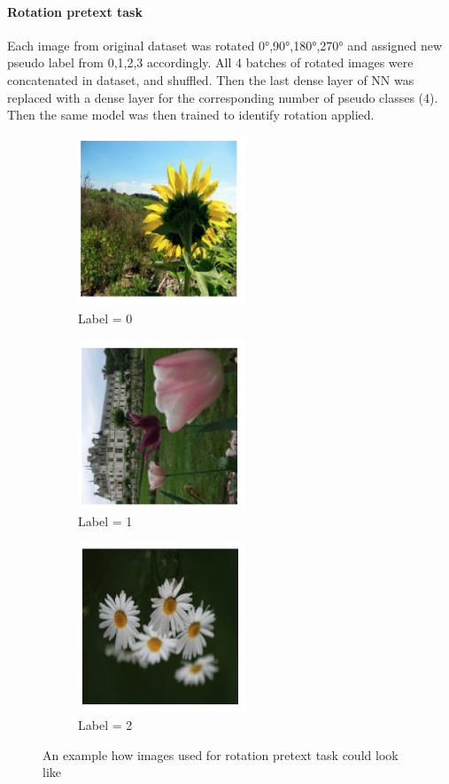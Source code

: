 \paragraph{Rotation pretext task}
Each image from original dataset was rotated 0°,90°,180°,270° and assigned new pseudo label from 0,1,2,3 accordingly.
All 4 batches of rotated images were concatenated in dataset, and shuffled.
Then the last dense layer of NN was replaced with a dense layer for the corresponding number of pseudo classes (4).
Then the same model was then trained to identify rotation applied.
\begin{figure}[h]
    \begin{subfigure}{0.33\textwidth}
        \caption{Label = 0}
        \includegraphics[width=5cm]{images/rot_0}
    \end{subfigure}
    \begin{subfigure}{0.2\textwidth}
        \caption{Label = 1}
        \includegraphics[width=5cm]{images/rot_1}
    \end{subfigure}
    \begin{subfigure}{0.33\textwidth}
        \caption{Label = 2}
        \includegraphics[width=5cm]{images/rot_2}
    \end{subfigure}
    \caption{An example how images used for rotation pretext task could look like}
\end{figure}




